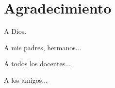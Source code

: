 \chapter*{Agradecimiento}
\doublespacing %

\begin{flushright}
	\begin{minipage}{0.6\textwidth} 
		A Dios.
	\end{minipage}
\end{flushright}

\vspace{0.3cm}

\begin{flushleft}
	\begin{minipage}{0.6\textwidth} 
		A mis padres, hermanos...
	\end{minipage}
\end{flushleft}

\vspace{0.3cm}

\begin{flushright}
	\begin{minipage}{0.6\textwidth} 
		A todos los docentes...
	\end{minipage}
\end{flushright}

\vspace{0.3cm}

\begin{flushleft}
	\begin{minipage}{0.6\textwidth} 
		A los amigos...
	\end{minipage}
\end{flushleft}